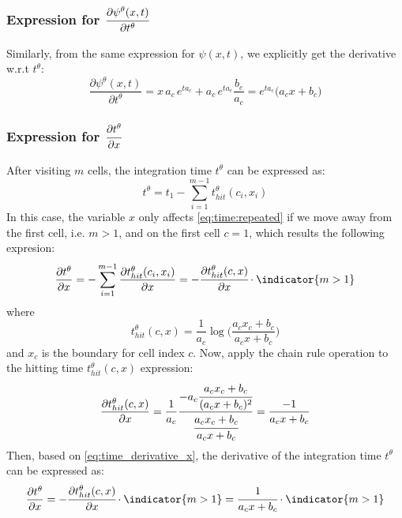 \subsubsection{Expression for $\cfrac{\partial \psi^\theta(x,t)}{\partial t^\theta}$}

Similarly, from the same expression for $\psi(x,t)$,
we explicitly get the derivative w.r.t $t^\theta$:
\begin{equation}\label{eq:psi_derivative_t:repeated}
    \frac{\partial \psi^\theta(x,t)}{\partial t^\theta} = x \, a_c \, e^{t a_c} + a_c \, e^{t a_c} \frac{b_c}{a_c} = 
    e^{t a_c} \big( a_c x + b_c \big)
\end{equation}


\subsubsection{Expression for $\cfrac{\partial t^\theta}{\partial x}$}


After visiting $m$ cells, the integration time $t^\theta$ can be expressed as:
\begin{equation}\label{eq:time:repeated}
t^\theta = t_1 - \sum_{i=1}^{m-1} t_{hit}^\theta(c_i, x_i)
\end{equation}
In this case, the variable $x$ only affects \cref{eq:time:repeated} if we move away from the first cell, i.e. $m>1$, and on the first cell $c=1$, which results the following expresion:
\begin{equation}\label{eq:time_derivative_x}
\frac{\partial t^\theta}{\partial x} = 
-\sum_{i=1}^{m-1} \frac{\partial t_{hit}^\theta(c_i, x_i)}{\partial x} = 
  -\cfrac{\partial t_{hit}^\theta(c, x)}{\partial x} \cdot \indicator{m>1} %
\end{equation}
where
\begin{equation}\label{eq:thit:repeat}
t_{hit}^\theta(c, x) = \frac{1}{a_c} \log \bigg( \frac{a_c x_c + b_c}{a_c x + b_c} \bigg)
\end{equation}
and $x_c$ is the boundary for cell index $c$. Now, apply the chain rule operation to the hitting time $t_{hit}^\theta(c, x)$ expression:
\begin{equation}\label{eq:thit_derivative_x}
\frac{\partial t_{hit}^\theta(c, x)}{\partial x} = 
\frac{1}{a_c} \frac{-a_{c}\cfrac{a_c x_c + b_c}{(a_c x + b_c)^2}}{\cfrac{a_c x_c + b_c}{a_c x + b_c}} = 
\frac{-1}{a_c x + b_c}
\end{equation}
Then, based on \cref{eq:time_derivative_x}, the derivative of the integration time $t^\theta$ can be expressed as:
\begin{equation}\label{eq:time_derivative_x_final}
\frac{\partial t^\theta}{\partial x} = %
-\cfrac{\partial t_{hit}^\theta(c, x)}{\partial x} \cdot \indicator{m>1} = %
\cfrac{1}{a_c x + b_c} \cdot \indicator{m>1} %
\end{equation}

